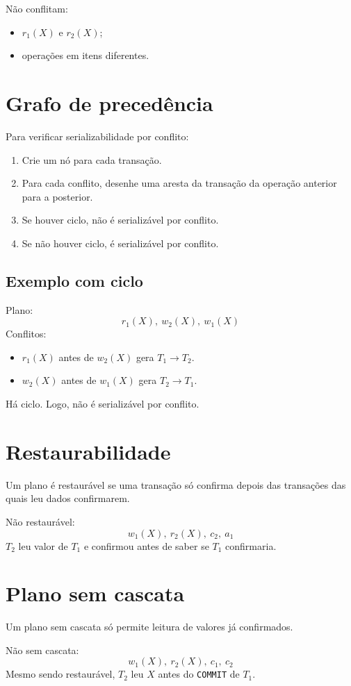 \documentclass[12pt,a4paper]{article}
\begin{document}
Não conflitam:
\begin{itemize}
    \item $r_1(X)$ e $r_2(X)$;
    \item operações em itens diferentes.
\end{itemize}

\section{Grafo de precedência}
Para verificar serializabilidade por conflito:
\begin{enumerate}
    \item Crie um nó para cada transação.
    \item Para cada conflito, desenhe uma aresta da transação da operação anterior para a posterior.
    \item Se houver ciclo, não é serializável por conflito.
    \item Se não houver ciclo, é serializável por conflito.
\end{enumerate}

\subsection{Exemplo com ciclo}
Plano:
\[
r_1(X),\ w_2(X),\ w_1(X)
\]
Conflitos:
\begin{itemize}
    \item $r_1(X)$ antes de $w_2(X)$ gera $T_1 \rightarrow T_2$.
    \item $w_2(X)$ antes de $w_1(X)$ gera $T_2 \rightarrow T_1$.
\end{itemize}
Há ciclo. Logo, não é serializável por conflito.

\section{Restaurabilidade}
Um plano é restaurável se uma transação só confirma depois das transações das quais leu dados confirmarem.

Não restaurável:
\[
w_1(X),\ r_2(X),\ c_2,\ a_1
\]
$T_2$ leu valor de $T_1$ e confirmou antes de saber se $T_1$ confirmaria.

\section{Plano sem cascata}
Um plano sem cascata só permite leitura de valores já confirmados.

Não sem cascata:
\[
w_1(X),\ r_2(X),\ c_1,\ c_2
\]
Mesmo sendo restaurável, $T_2$ leu $X$ antes do \texttt{COMMIT} de $T_1$.
\end{document}
